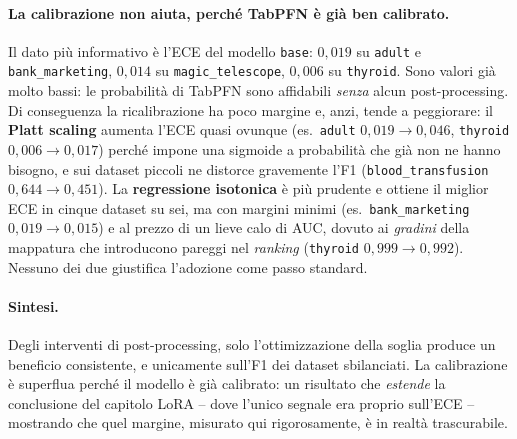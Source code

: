 \paragraph{La calibrazione non aiuta, perché TabPFN è già ben calibrato.}
Il dato più informativo è l'ECE del modello \texttt{base}: $0{,}019$ su
\texttt{adult} e \texttt{bank\_marketing}, $0{,}014$ su \texttt{magic\_telescope},
$0{,}006$ su \texttt{thyroid}. Sono valori già molto bassi: le probabilità di
TabPFN sono affidabili \emph{senza} alcun post-processing. Di conseguenza la
ricalibrazione ha poco margine e, anzi, tende a peggiorare: il \textbf{Platt
scaling} aumenta l'ECE quasi ovunque (es.\ \texttt{adult} $0{,}019 \to 0{,}046$,
\texttt{thyroid} $0{,}006 \to 0{,}017$) perché impone una sigmoide a
probabilità che già non ne hanno bisogno, e sui dataset piccoli ne distorce
gravemente l'F1 (\texttt{blood\_transfusion} $0{,}644 \to 0{,}451$). La
\textbf{regressione isotonica} è più prudente e ottiene il miglior ECE in
cinque dataset su sei, ma con margini minimi (es.\ \texttt{bank\_marketing}
$0{,}019 \to 0{,}015$) e al prezzo di un lieve calo di AUC, dovuto ai
\emph{gradini} della mappatura che introducono pareggi nel \emph{ranking}
(\texttt{thyroid} $0{,}999 \to 0{,}992$). Nessuno dei due giustifica
l'adozione come passo standard.

\paragraph{Sintesi.} Degli interventi di post-processing, solo
l'ottimizzazione della soglia produce un beneficio consistente, e unicamente
sull'F1 dei dataset sbilanciati. La calibrazione è superflua perché il modello
è già calibrato: un risultato che \emph{estende} la conclusione del capitolo
LoRA -- dove l'unico segnale era proprio sull'ECE -- mostrando che quel margine,
misurato qui rigorosamente, è in realtà trascurabile.

